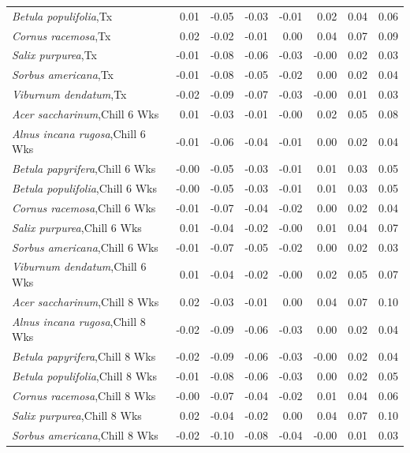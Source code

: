 \documentclass{article}\usepackage[]{graphicx}\usepackage[]{color}
\begin{document}
\begin{longtable}{lrrrrrrr}
  \textit{Betula populifolia},Tx & 0.01 & -0.05 & -0.03 & -0.01 & 0.02 & 0.04 & 0.06 \\ 
  \textit{Cornus racemosa},Tx & 0.02 & -0.02 & -0.01 & 0.00 & 0.04 & 0.07 & 0.09 \\ 
  \textit{Salix purpurea},Tx & -0.01 & -0.08 & -0.06 & -0.03 & -0.00 & 0.02 & 0.03 \\ 
  \textit{Sorbus americana},Tx & -0.01 & -0.08 & -0.05 & -0.02 & 0.00 & 0.02 & 0.04 \\ 
  \textit{Viburnum dendatum},Tx & -0.02 & -0.09 & -0.07 & -0.03 & -0.00 & 0.01 & 0.03 \\ 
  \textit{Acer saccharinum},Chill 6 Wks & 0.01 & -0.03 & -0.01 & -0.00 & 0.02 & 0.05 & 0.08 \\ 
  \textit{Alnus incana rugosa},Chill 6 Wks & -0.01 & -0.06 & -0.04 & -0.01 & 0.00 & 0.02 & 0.04 \\ 
  \textit{Betula papyrifera},Chill 6 Wks & -0.00 & -0.05 & -0.03 & -0.01 & 0.01 & 0.03 & 0.05 \\ 
  \textit{Betula populifolia},Chill 6 Wks & -0.00 & -0.05 & -0.03 & -0.01 & 0.01 & 0.03 & 0.05 \\ 
  \textit{Cornus racemosa},Chill 6 Wks & -0.01 & -0.07 & -0.04 & -0.02 & 0.00 & 0.02 & 0.04 \\ 
  \textit{Salix purpurea},Chill 6 Wks & 0.01 & -0.04 & -0.02 & -0.00 & 0.01 & 0.04 & 0.07 \\ 
  \textit{Sorbus americana},Chill 6 Wks & -0.01 & -0.07 & -0.05 & -0.02 & 0.00 & 0.02 & 0.03 \\ 
  \textit{Viburnum dendatum},Chill 6 Wks & 0.01 & -0.04 & -0.02 & -0.00 & 0.02 & 0.05 & 0.07 \\ 
  \textit{Acer saccharinum},Chill 8 Wks & 0.02 & -0.03 & -0.01 & 0.00 & 0.04 & 0.07 & 0.10 \\ 
  \textit{Alnus incana rugosa},Chill 8 Wks & -0.02 & -0.09 & -0.06 & -0.03 & 0.00 & 0.02 & 0.04 \\ 
  \textit{Betula papyrifera},Chill 8 Wks & -0.02 & -0.09 & -0.06 & -0.03 & -0.00 & 0.02 & 0.04 \\ 
  \textit{Betula populifolia},Chill 8 Wks & -0.01 & -0.08 & -0.06 & -0.03 & 0.00 & 0.02 & 0.05 \\ 
  \textit{Cornus racemosa},Chill 8 Wks & -0.00 & -0.07 & -0.04 & -0.02 & 0.01 & 0.04 & 0.06 \\ 
  \textit{Salix purpurea},Chill 8 Wks & 0.02 & -0.04 & -0.02 & 0.00 & 0.04 & 0.07 & 0.10 \\ 
  \textit{Sorbus americana},Chill 8 Wks & -0.02 & -0.10 & -0.08 & -0.04 & -0.00 & 0.01 & 0.03 \\ 

\end{longtable}
\end{document}
